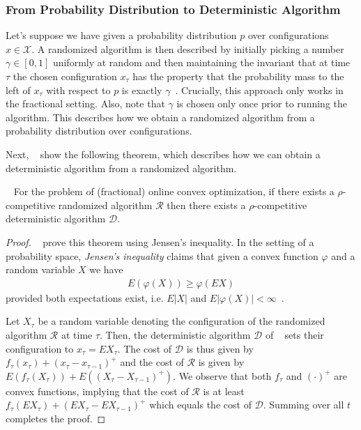 \subsubsection{From Probability Distribution to Deterministic Algorithm}

Let's suppose we have given a probability distribution $p$ over configurations $x \in \mathcal{X}$. A randomized algorithm is then described by initially picking a number $\gamma \in [0,1]$ uniformly at random and then maintaining the invariant that at time $\tau$ the chosen configuration $x_{\tau}$ has the property that the probability mass to the left of $x_{\tau}$ with respect to $p$ is exactly $\gamma$~\cite{Bansal2015}. Crucially, this approach only works in the fractional setting. Also, note that $\gamma$ is chosen only once prior to running the algorithm. This describes how we obtain a randomized algorithm from a probability distribution over configurations.

Next, \citeauthor*{Bansal2015}~\cite{Bansal2015} show the following theorem, which describes how we can obtain a deterministic algorithm from a randomized algorithm. \begin{theorem}
   ~\cite{Bansal2015} For the problem of (fractional) online convex optimization, if there exists a $\rho$-competitive randomized algorithm $\mathcal{R}$ then there exists a $\rho$-competitive deterministic algorithm $\mathcal{D}$.
\end{theorem}
\begin{proof}
\citeauthor*{Bansal2015}~\cite{Bansal2015} prove this theorem using Jensen's inequality. In the setting of a probability space, \emph{Jensen's inequality} claims that given a convex function $\varphi$ and a random variable $X$ we have \begin{align}
    E(\varphi(X)) \geq \varphi(E X)
\end{align} provided both expectations exist, i.e. $E |X|$ and $E |\varphi(X)| < \infty$~\cite{Durrett2010}.

Let $X_{\tau}$ be a random variable denoting the configuration of the randomized algorithm $\mathcal{R}$ at time $\tau$. Then, the deterministic algorithm $\mathcal{D}$ of \citeauthor*{Bansal2015}~\cite{Bansal2015} sets their configuration to $x_{\tau} = E X_{\tau}$. The cost of $\mathcal{D}$ is thus given by $f_{\tau}(x_{\tau}) + (x_{\tau} - x_{\tau-1})^+$ and the cost of $\mathcal{R}$ is given by $E(f_{\tau}(X_{\tau})) + E((X_{\tau} - X_{\tau-1})^+)$. We observe that both $f_{\tau}$ and $(\cdot)^+$ are convex functions, implying that the cost of $\mathcal{R}$ is at least $f_{\tau}(E X_{\tau}) + (E X_{\tau} - E X_{\tau-1})^+$ which equals the cost of $\mathcal{D}$. Summing over all $t$ completes the proof.
\end{proof}

